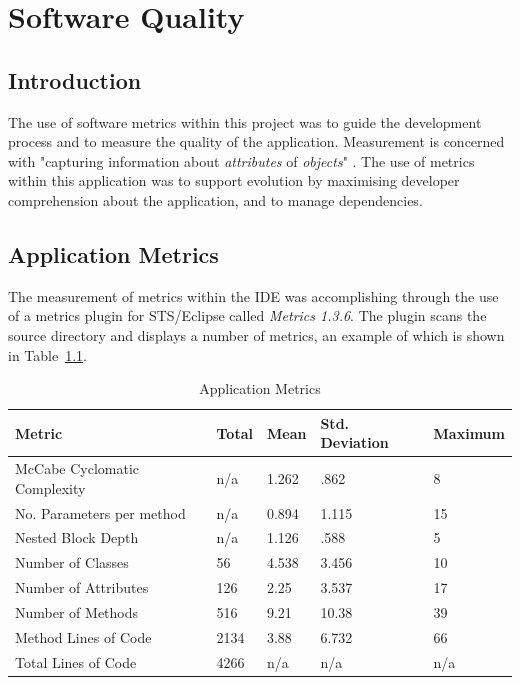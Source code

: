 \chapter{Software Quality}
\label{squality}

\section{Introduction}

The use of software metrics within this project was to guide the development process and to measure the quality of the application. Measurement is concerned with "capturing information about \textit{attributes} of \textit{objects}" \parencite{softmetrics}. The use of metrics within this application was to support evolution by maximising developer comprehension about the application, and to manage dependencies.

\section{Application Metrics}

The measurement of metrics within the IDE was accomplishing through the use of a metrics plugin for STS/Eclipse called \textit{Metrics 1.3.6}. The plugin scans the source directory and displays a number of metrics, an example of which is shown in Table~\ref{fig:metricstable}. 

\begin{table}[H]
\begin{center}
    \begin{tabular}{| l | l | l | l | p{2.3cm} |}
    \hline
    Metric & Total & Mean & Std. Deviation & Maximum\\ \hline
	McCabe Cyclomatic Complexity & n/a & 1.262 & .862 & 8\\ \hline
	No. Parameters per method & n/a & 0.894 & 1.115 & 15\\ \hline
	Nested Block Depth & n/a & 1.126 & .588 & 5\\ \hline
	Number of Classes & 56 & 4.538 & 3.456 & 10\\ \hline
	Number of Attributes & 126 & 2.25 & 3.537 & 17\\ \hline
	Number of Methods& 516 & 9.21 & 10.38 & 39\\ \hline
	Method Lines of Code& 2134 & 3.88 & 6.732 & 66\\ \hline
	Total Lines of Code& 4266 & n/a & n/a & n/a\\ \hline
    \end{tabular}
\end{center}
\caption{Application Metrics}
\label{fig:metricstable}
\end{table}


